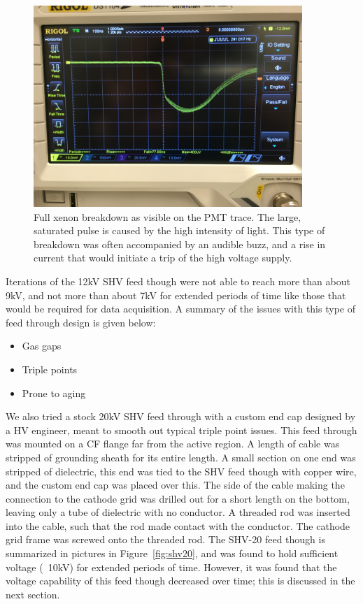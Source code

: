 \begin{figure}[htbp]
\begin{center}
\includegraphics[width=4in]{figures/testbed/breakdown.jpg}
\caption{Full xenon breakdown as visible on the PMT trace. The large, saturated pulse is caused by the high intensity of light. This type of breakdown was often accompanied by an audible buzz, and a rise in current that would initiate a trip of the high voltage supply.}
\label{fig:breakdown}
\end{center}
\end{figure}

Iterations of the 12kV SHV feed though were not able to reach more than about 9kV, and not more than about 7kV for extended periods of time like those that would be required for data acquisition. A summary of the issues with this type of feed through design is given below:
\begin{itemize}
\item Gas gaps
\item Triple points
\item Prone to aging
\end{itemize}

We also tried a stock 20kV SHV feed through with a custom end cap designed by a \ac{HV} engineer, meant to smooth out typical triple point issues. This feed through was mounted on a CF flange far from the active region. A length of cable was stripped of grounding sheath for its entire length. A small section on one end was stripped of dielectric, this end was tied to the SHV feed though with copper wire, and the custom end cap was placed over this. The side of the cable making the connection to the cathode grid was drilled out for a short length on the bottom, leaving only a tube of dielectric with no conductor. A threaded rod was inserted into the cable, such that the rod made contact with the conductor. The cathode grid frame was screwed onto the threaded rod. The SHV-20 feed though is summarized in pictures in Figure~\ref{fig:shv20}, and was found to hold sufficient voltage (~10kV) for extended periods of time. However, it was found that the voltage capability of this feed though decreased over time; this is discussed in the next section.


